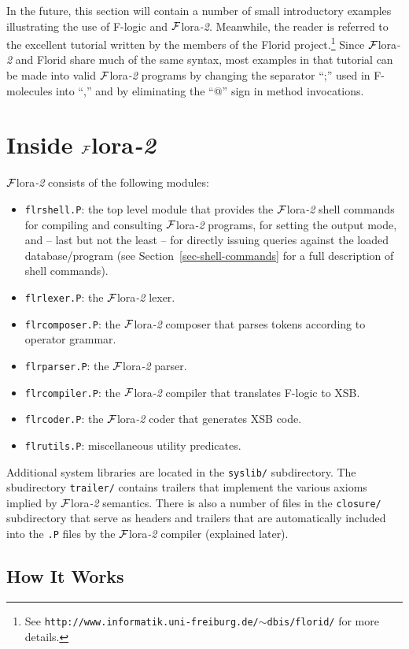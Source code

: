 \documentclass[11pt]{article}
\newcommand{\FLORA}{{\mbox{${\cal F}${\sc lora}\rm\emph{-2}}}\xspace}
\newcommand{\FLORID}{{\mbox{\sc Florid}}\xspace}
\newcommand{\fl}{\mbox{F-logic}\xspace}
\begin{document}
In the future, this section will contain a number of small
introductory examples illustrating the use of \fl and \FLORA. Meanwhile, the
reader is referred to the excellent tutorial written by the members of the
\FLORID project.\footnote{
  See {\tt http://www.informatik.uni-freiburg.de/$\sim$dbis/florid/} for more
  details.
  }
Since \FLORA and \FLORID share much of the same syntax, most examples in that
tutorial can be made into valid \FLORA programs by changing the separator
``;'' used in F-molecules into ``,'' and by eliminating the ``@''
sign in method invocations.



\section{Inside \FLORA}


\FLORA consists of the following modules:
\begin{itemize}
\item \texttt{flrshell.P}: the top level module that provides the \FLORA shell
  commands for compiling and consulting \FLORA programs, for setting the output mode,
  and -- last but not the least -- for directly issuing queries against the loaded
  database/program (see Section~\ref{sec-shell-commands} for a full
  description of shell commands).
\item \texttt{flrlexer.P}: the \FLORA lexer.
\item \texttt{flrcomposer.P}: the \FLORA composer that parses tokens according to operator grammar.
\item \texttt{flrparser.P}: the \FLORA parser.
\item \texttt{flrcompiler.P}: the \FLORA compiler that translates \fl to XSB.
\item \texttt{flrcoder.P}: the \FLORA coder that generates XSB code.
\item \texttt{flrutils.P}: miscellaneous utility predicates.
\end{itemize}
Additional system libraries are located in the {\tt syslib/} subdirectory.
The sbudirectory {\tt trailer/} contains trailers that implement the
various axioms implied by \FLORA semantics.  There is also a number of
files in the {\tt closure/} subdirectory that serve as headers and trailers
that are automatically included into the {\tt .P} files by the \FLORA
compiler (explained later).


\subsection{How It Works}
\end{document}
